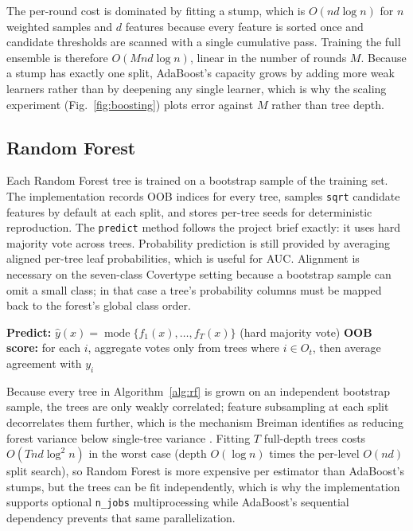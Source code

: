 \documentclass[conference]{IEEEtran}
\begin{document}
The per-round cost is dominated by fitting a stump, which is
$O(nd\log n)$ for $n$ weighted samples and $d$ features because every
feature is sorted once and candidate thresholds are scanned with a single
cumulative pass. Training the full ensemble is therefore
$O(Mnd\log n)$, linear in the number of rounds $M$. Because a stump has
exactly one split, AdaBoost's capacity grows by adding more weak
learners rather than by deepening any single learner, which is why the
scaling experiment (Fig.~\ref{fig:boosting}) plots error against $M$ rather
than tree depth.

\subsection{Random Forest}
Each Random Forest tree is trained on a bootstrap sample of the training set.
The implementation records OOB indices for every tree, samples
\texttt{sqrt} candidate features by default at each split, and stores per-tree
seeds for deterministic reproduction. The \texttt{predict} method follows the
project brief exactly: it uses hard majority vote across trees. Probability
prediction is still provided by averaging aligned per-tree leaf
probabilities, which is useful for AUC. Alignment is necessary on the
seven-class Covertype setting because a bootstrap sample can omit a small class; in
that case a tree's probability columns must be mapped back to the forest's
global class order.

\begin{algorithm}[t]
\SetAlgoLined
{}
\textbf{Predict:} $\hat{y}(x) = \operatorname{mode}\{f_1(x),\dots,f_T(x)\}$
(hard majority vote)\;
\textbf{OOB score:} for each $i$, aggregate votes only from trees where
$i \in O_t$, then average agreement with $y_i$\;
\caption{Bagging with feature subsampling, as implemented by
\texttt{RandomForestClassifier.fit}.}
\label{alg:rf}
\end{algorithm}

Because every tree in Algorithm~\ref{alg:rf} is grown on an independent
bootstrap sample, the trees are only weakly correlated; feature subsampling
at each split decorrelates them further, which is the mechanism Breiman
identifies as reducing forest variance below single-tree variance
\cite{breiman2001random}. Fitting $T$ full-depth trees costs
$O(Tnd\log^2 n)$ in the worst case (depth $O(\log n)$ times the per-level
$O(nd)$ split search), so Random Forest is more expensive per estimator
than AdaBoost's stumps, but the trees can be fit independently, which is why
the implementation supports optional \texttt{n\_jobs} multiprocessing while
AdaBoost's sequential dependency prevents that same parallelization.
\end{document}
